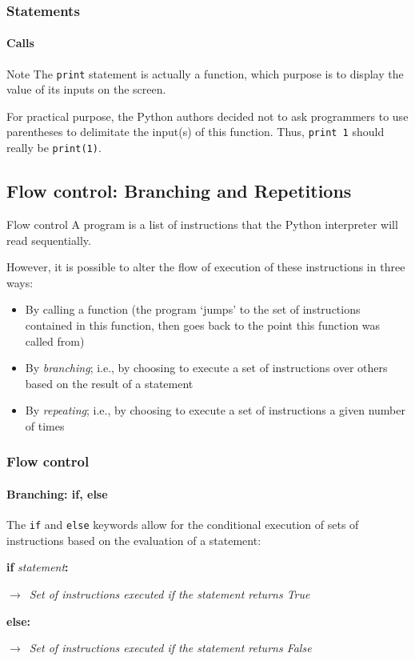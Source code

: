 \documentclass[handout]{beamer}
\newcommand{\comment}[1]{{\raggedright $\rightarrow$~\textit{\textsf{#1}}}}
\begin{document}
\begin{frame}
	\frametitle{Statements}
	\framesubtitle{Calls}

	\begin{block}{Note}
		The \texttt{print} statement is actually a function, which purpose is to display the value of its inputs on the screen.

		\pause
		\bigskip
		For practical purpose, the Python authors decided not to ask programmers to use parentheses to delimitate the input(s) of this function. Thus, \texttt{print 1} should really be \texttt{print(1)}.
	\end{block}
\end{frame}


\subsection{Flow control: Branching and Repetitions}

\begin{frame}{Flow control}
	A program is a list of instructions that the Python interpreter will read sequentially.

	\pause
	\bigskip
	However, it is possible to alter the flow of execution of these instructions in three ways:

	\begin{itemize}
		\pause
		\item By calling a function (the program `jumps' to the set of instructions contained in this function, then goes back to the point this function was called from)

		\pause
		\item By \textit{branching}; i.e., by choosing to execute a set of instructions over others based on the result of a statement

		\pause
		\item By \textit{repeating}; i.e., by choosing to execute a set of instructions a given number of times
	\end{itemize}
\end{frame}

\begin{frame}[fragile]
	\frametitle{Flow control}
	\framesubtitle{Branching: if, else}

	The \texttt{if} and \texttt{else} keywords allow for the conditional execution of sets of instructions based on the evaluation of a statement:

	\begin{semiverbatim}
	\textbf{if} \textit{statement}\textbf{:}
	  \comment{Set of instructions executed if the statement returns True}
	\textbf{else:}
	  \comment{Set of instructions executed if the statement returns False}
	\end{semiverbatim}
\end{frame}
\end{document}
